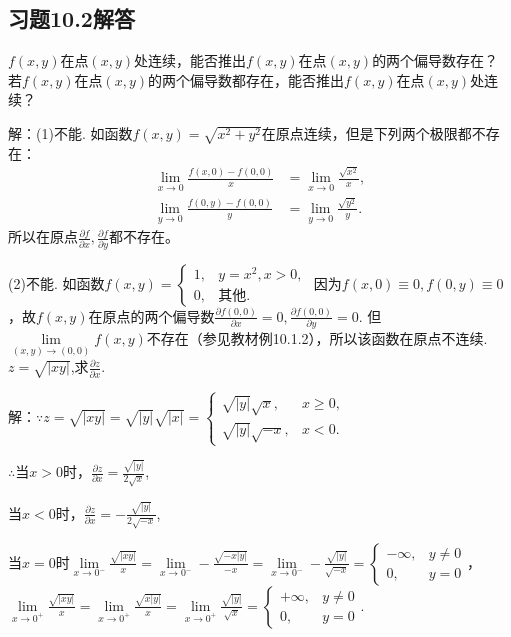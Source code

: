 \documentclass[12pt,UTF8]{ctexart}
\begin{document}
\subsection{习题10.2解答}
\begin{enumerate}
$f(x,y)$在点$(x,y)$处连续，能否推出$f(x,y)$在点$(x,y)$的两个偏导数存在？若$f(x,y)$在点$(x,y)$的两个偏导数都存在，能否推出$f(x,y)$在点$(x,y)$处连续？

解：(1)不能. 如函数$f(x,y)=\sqrt{x^2+y^2}$在原点连续，但是下列两个极限都不存在：
\[\begin{split}
\lim\limits_{x\rightarrow0}\frac{f(x,0)-f(0,0)}{x}&=\lim\limits_{x\rightarrow0}\frac{\sqrt{x^2}}{x},\\
\lim\limits_{y\rightarrow0}\frac{f(0,y)-f(0,0)}{y}&=\lim\limits_{y\rightarrow0}\frac{\sqrt{y^2}}{y}.
\end{split}\]
所以在原点$\frac{\partial f}{\partial x},\frac{\partial f}{\partial y}$都不存在。

(2)不能. 如函数$f(x,y)=\begin{cases}
1,&y=x^2,x>0,\\
0,&\text{其他}.
\end{cases}$ 因为$f(x,0)\equiv0,f(0,y)\equiv0$，故$f(x,y)$在原点的两个偏导数$\frac{\partial f(0,0)}{\partial x}=0,\frac{\partial f(0,0)}{\partial y}=0$. 但$\lim\limits_{(x,y)\rightarrow(0,0)}f(x,y)$不存在（参见教材例10.1.2），所以该函数在原点不连续.
$z=\sqrt{|xy|}$,求$\frac{\partial z}{\partial x}$.

解：$\because z=\sqrt{|xy|}=\sqrt{|y|}\sqrt{|x|}=\begin{cases}
\sqrt{|y|}\sqrt{x},&x\geq0,\\
\sqrt{|y|}\sqrt{-x},&x<0.
\end{cases}$

$\therefore$当$x>0$时，$\frac{\partial z}{\partial x}=\frac{\sqrt{|y|}}{2\sqrt x}$,

当$x<0$时，$\frac{\partial z}{\partial x}=-\frac{\sqrt{|y|}}{2\sqrt{-x}}$,

当$x=0$时$\lim\limits_{x\rightarrow0^-}\frac{\sqrt{|xy|}}{x}=\lim\limits_{x\rightarrow0^-}-\frac{\sqrt{-x|y|}}{-x}=\lim\limits_{x\rightarrow0^-}-\frac{\sqrt{|y|}}{\sqrt{-x}}=\begin{cases}
-\infty,&y\neq0\\
0,&y=0
\end{cases}$，\\
$\lim\limits_{x\rightarrow0^+}\frac{\sqrt{|xy|}}{x}=\lim\limits_{x\rightarrow0^+}\frac{\sqrt{x|y|}}{x}=\lim\limits_{x\rightarrow0^+}\frac{\sqrt{|y|}}{\sqrt{x}}=\begin{cases}
+\infty,&y\neq0\\
0,&y=0
\end{cases}$.


\end{enumerate}
\end{document}
